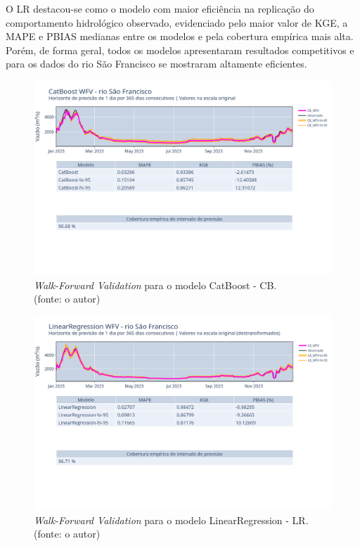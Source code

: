 O LR destacou-se como o modelo com maior eficiência na replicação do comportamento hidrológico observado, evidenciado pelo maior valor de KGE, a MAPE e PBIAS medianas entre os modelos e pela cobertura empírica mais alta. Porém, de forma geral, todos os modelos apresentaram resultados competitivos e para os dados do rio São Francisco se mostraram altamente eficientes.

\begin{figure}[!h]
\centering
\includegraphics[scale=0.33]{Figuras/rio_sao_francisco/wfv/CB/CB_WFV_ORIG.png}
\caption{\textit{Walk-Forward Validation} para o modelo CatBoost - CB.\\(fonte: o autor)}
\label{fig:francisco_CB_WFV_ORIG}
\end{figure}

\begin{figure}[!h]
\centering
\includegraphics[scale=0.33]{Figuras/rio_sao_francisco/wfv/LR/LR_WFV_LOG.png}
\caption{\textit{Walk-Forward Validation} para o modelo LinearRegression - LR.\\(fonte: o autor)}
\label{fig:francisco_LR_WFV_LOG}
\end{figure}

